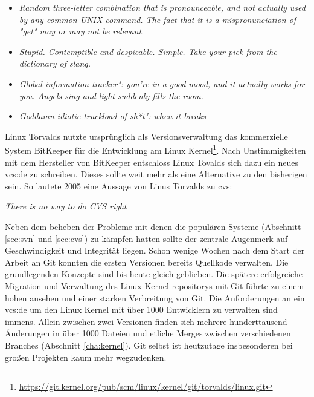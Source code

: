 \begin{itemize}
  \item \textit{\glqq{}Random three-letter combination that is pronounceable, and not
  actually used by any common UNIX command. The fact that it is a
  mispronunciation of "get" may or may not be relevant.\grqq{}}
  \item \textit{\glqq{}Stupid. Contemptible and despicable. Simple. Take your pick from the
  dictionary of slang.\grqq{}}
  \item \textit{\glqq{}Global information tracker": you're in a good mood, and it actually
  works for you. Angels sing and light suddenly fills the room.\grqq{}}
  \item \textit{\glqq{}Goddamn idiotic truckload of sh*t": when it breaks\grqq{}}
\end{itemize}

Linux Torvalds nutzte ursprünglich als Versionsverwaltung das kommerzielle System BitKeeper für
die Entwicklung am Linux
Kernel\footnote{\url{https://git.kernel.org/pub/scm/linux/kernel/git/torvalds/linux.git}}.
Nach Unstimmigkeiten mit dem Hersteller von BitKeeper entschloss Linux Tovalds
sich dazu ein neues \gls{vcs:de} zu schreiben. Dieses sollte weit mehr als
eine Alternative zu den bisherigen sein\cite[s.~13]{gitosp}. So lautete 2005
eine Aussage von Linus Torvalds zu \acrshort{cvs}\cite[s.~385]{cd}:

\begin{center}
\textit{\glqq{}There is no way to do CVS right\grqq{}}\\
\end{center}

Neben dem beheben der Probleme mit denen die populären Systeme (Abschnitt
\ref{sec:svn} und \ref{sec:cvs}) zu kämpfen hatten sollte der zentrale
Augenmerk auf Geschwindigkeit und Integrität liegen. Schon wenige Wochen nach
dem Start der Arbeit an Git konnten die ersten Versionen bereits Quellkode
verwalten. Die grundlegenden Konzepte sind bis heute gleich geblieben. Die
spätere erfolgreiche Migration und Verwaltung des Linux Kernel
\glspl{repository} mit Git führte zu einem hohen ansehen und einer starken
Verbreitung von Git. Die Anforderungen an ein \gls{vcs:de} um den Linux Kernel
mit über 1000 Entwicklern zu verwalten sind immens. Allein zwischen zwei
Versionen finden sich mehrere hunderttausend Änderungen in über 1000 Dateien
und etliche Merges zwischen verschiedenen Branches (Abschnitt
\ref{cha:kernel}). Git selbst ist heutzutage insbesonderen bei großen Projekten
kaum mehr wegzudenken.\cite[s.~13]{gitosp}

